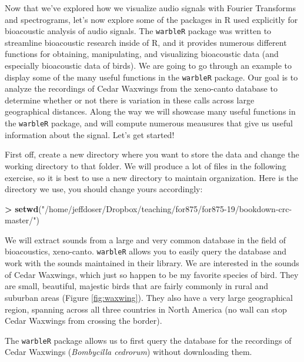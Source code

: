 \documentclass[]{krantz}
\makeatletter
\newenvironment{Shaded}{\begin{snugshade}}{\end{snugshade}}
\newcommand{\KeywordTok}[1]{\textcolor[rgb]{0.27,0.27,0.27}{\textbf{#1}}}
\newcommand{\NormalTok}[1]{#1}
\newcommand{\OperatorTok}[1]{\textcolor[rgb]{0.43,0.43,0.43}{\textbf{#1}}}
\newcommand{\StringTok}[1]{\textcolor[rgb]{0.5,0.5,0.5}{#1}}
\newenvironment{kframe}{%
\medskip{}
\setlength{\fboxsep}{.8em}
 \def\at@end@of@kframe{}%
 \ifinner\ifhmode%
  \def\at@end@of@kframe{\end{minipage}}%
  \begin{minipage}{\columnwidth}%
 \fi\fi%
 \def\FrameCommand##1{\hskip\@totalleftmargin \hskip-\fboxsep
 \colorbox{shadecolor}{##1}\hskip-\fboxsep
     \hskip-\linewidth \hskip-\@totalleftmargin \hskip\columnwidth}%
 \MakeFramed {\advance\hsize-\width
   \@totalleftmargin\z@ \linewidth\hsize
   \@setminipage}}%
 {\par\unskip\endMakeFramed%
 \at@end@of@kframe}
\renewenvironment{Shaded}{\begin{kframe}}{\end{kframe}}
\makeatother
\begin{document}
Now that we've explored how we visualize audio signals with Fourier Transforms and spectrograms, let's now explore some of the packages in R used explicitly for bioacoustic analysis of audio signals. The \texttt{warbleR} package was written to streamline bioacoustic research inside of R, and it provides numerous different functions for obtaining, manipulating, and visualizing bioacoustic data (and especially bioacoustic data of birds). We are going to go through an example to display some of the many useful functions in the \texttt{warbleR} package. Our goal is to analyze the recordings of Cedar Waxwings from the xeno-canto database to determine whether or not there is variation in these calls across large geographical distances. Along the way we will showcase many useful functions in the \texttt{warbleR} package, and will compute numerous meausures that give us useful information about the signal. Let's get started!

First off, create a new directory where you want to store the data and change the working directory to that folder. We will produce a lot of files in the following exercise, so it is best to use a new directory to maintain organization. Here is the directory we use, you should change yours accordingly:

\begin{Shaded}
\begin{Highlighting}[]
\OperatorTok{>}\StringTok{ }\KeywordTok{setwd}\NormalTok{(}\StringTok{"/home/jeffdoser/Dropbox/teaching/for875/for875-19/bookdown-crc-master/"}\NormalTok{)}
\end{Highlighting}
\end{Shaded}

We will extract sounds from a large and very common database in the field of bioacoustics, xeno-canto. \texttt{warbleR} allows you to easily query the database and work with the sounds maintained in their library. We are interested in the sounds of Cedar Waxwings, which just so happen to be my favorite species of bird. They are small, beautiful, majestic birds that are fairly commonly in rural and suburban areas (Figure \ref{fig:waxwing}). They also have a very large geographical region, spanning across all three countries in North America (no wall can stop Cedar Waxwings from crossing the border).

The \texttt{warbleR} package allows us to first query the database for the recordings of Cedar Waxwings (\emph{Bombycilla cedrorum}) without downloading them.
\end{document}
